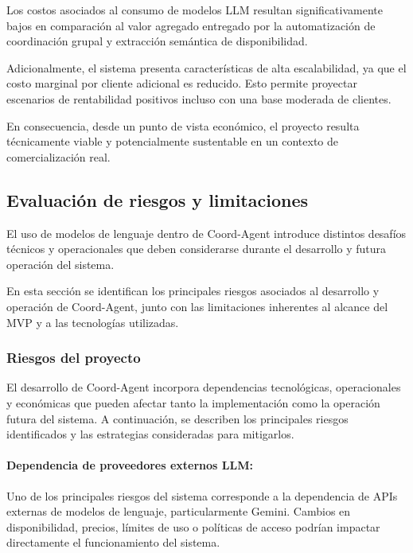 Los costos asociados al consumo de modelos LLM resultan significativamente bajos en comparación al valor agregado entregado por la automatización de coordinación grupal y extracción semántica de disponibilidad.

Adicionalmente, el sistema presenta características de alta escalabilidad, ya que el costo marginal por cliente adicional es reducido. Esto permite proyectar escenarios de rentabilidad positivos incluso con una base moderada de clientes.

En consecuencia, desde un punto de vista económico, el proyecto resulta técnicamente viable y potencialmente sustentable en un contexto de comercialización real.




\subsection{Evaluación de riesgos y limitaciones}

El uso de modelos de lenguaje dentro de Coord-Agent introduce distintos desafíos técnicos y operacionales que deben considerarse durante el desarrollo y futura operación del sistema.

En esta sección se identifican los principales riesgos asociados al desarrollo y operación de Coord-Agent, junto con las limitaciones inherentes al alcance del MVP y a las tecnologías utilizadas.

\subsubsection{Riesgos del proyecto}

El desarrollo de Coord-Agent incorpora dependencias tecnológicas, operacionales y económicas que pueden afectar tanto la implementación como la operación futura del sistema. A continuación, se describen los principales riesgos identificados y las estrategias consideradas para mitigarlos.

\paragraph{Dependencia de proveedores externos LLM:}

Uno de los principales riesgos del sistema corresponde a la dependencia de APIs externas de modelos de lenguaje, particularmente Gemini. Cambios en disponibilidad, precios, límites de uso o políticas de acceso podrían impactar directamente el funcionamiento del sistema.

